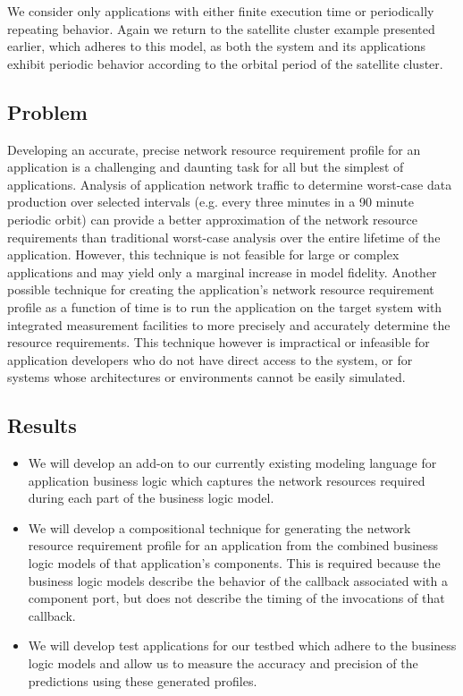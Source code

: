 We consider only applications with either finite execution time or
periodically repeating behavior.  Again we return to the satellite
cluster example presented earlier, which adheres to this model, as
both the system and its applications exhibit periodic behavior
according to the orbital period of the satellite cluster.

\subsection{Problem}
Developing an accurate, precise network resource requirement profile
for an application is a challenging and daunting task for all but the
simplest of applications.  Analysis of application network traffic to
determine worst-case data production over selected intervals
(e.g. every three minutes in a 90 minute periodic orbit) can provide a
better approximation of the network resource requirements than
traditional worst-case analysis over the entire lifetime of the
application.  However, this technique is not feasible for large or
complex applications and may yield only a marginal increase in model
fidelity.  Another possible technique for creating the application's
network resource requirement profile as a function of time is to run
the application on the target system with integrated measurement
facilities to more precisely and accurately determine the resource
requirements.  This technique however is impractical or infeasible for
application developers who do not have direct access to the system, or
for systems whose architectures or environments cannot be easily
simulated.

\subsection{Results}
\begin{itemize}
	\item We will develop an add-on to our currently existing
          modeling language for application business logic which
          captures the network resources required during each part of
          the business logic model.
	\item We will develop a compositional technique for generating
          the network resource requirement profile for an application
          from the combined business logic models of that
          application's components.  This is required because the
          business logic models describe the behavior of the callback
          associated with a component port, but does not describe the
          timing of the invocations of that callback.
	\item We will develop test applications for our testbed which
          adhere to the business logic models and allow us to measure
          the accuracy and precision of the predictions using these
          generated profiles.
\end{itemize}

\fi
